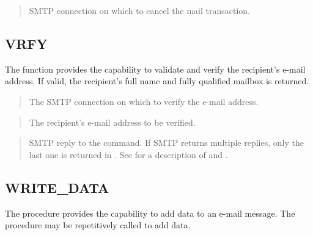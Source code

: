 \documentclass[letterpaper,10pt,english,openany,oneside]{sphinxmanual}
\begin{document}

\begin{quote}

SMTP connection on which to cancel the mail transaction.
\end{quote}


\subsection{VRFY}
\label{\detokenize{utl_smtp:vrfy}}
The  function provides the capability to validate and verify the
recipient’s e-mail address. If valid, the recipient’s full name and
fully qualified mailbox is returned.
\begin{quote}

\end{quote}


\begin{quote}

The SMTP connection on which to verify the e-mail address.
\end{quote}

\begin{quote}

The recipient’s e-mail address to be verified.
\end{quote}

\begin{quote}

SMTP reply to the command. If SMTP returns multiple replies, only the
last one is returned in . See {\hyperref[\detokenize{utl_smtp:reply-replies}]{}} for a description
of  and .
\end{quote}


\subsection{WRITE\_DATA}
\label{\detokenize{utl_smtp:write-data}}
The  procedure provides the capability to add  data
to an e-mail message. The  procedure may be repetitively
called to add data.
\begin{quote}

\end{quote}
\end{document}
